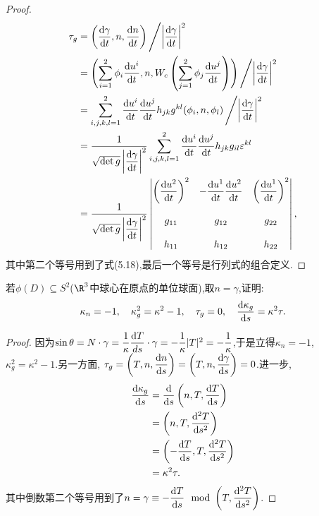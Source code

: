 	\begin{proof}
		\begin{align*}
			\tau_{g}&=\left(\frac{\mathrm{d} \gamma}{\mathrm{d} t},n,\frac{\mathrm{d} n}{\mathrm{d} t}\right)\left/\left|\frac{\mathrm{d} \gamma}{\mathrm{d} t}\right|^{2}\right.\\
			&=\Biggl(\sum_{i=1}^{2}\phi_{i}\frac{\mathrm{d} u^{i}}{\mathrm{d} t},n,W_{c}\left(\sum_{j=1}^{2}\phi_{j}\frac{\mathrm{d} u^{j}}{\mathrm{d} t}\right)\Biggr)\left/\left|\frac{\mathrm{d} \gamma}{\mathrm{d} t}\right|^{2}\right.\\
			&=\sum_{i,j,k,l=1}^{2}\frac{\mathrm{d} u^{i}}{\mathrm{d} t}\frac{\mathrm{d} u^{j}}{\mathrm{d} t}h_{jk}g^{kl}(\phi_{i},n,\phi_{l})\left/\left|\frac{\mathrm{d} \gamma}{\mathrm{d} t}\right|^{2}\right.\\
			&=\frac{1}{\sqrt{\det g}\left| \dfrac{\mathrm{d}\gamma}{\mathrm{d} t} \right|^{2}}\sum_{i,j,k,l=1}^{2}\frac{\mathrm{d} u^{i}}{\mathrm{d} t}\frac{\mathrm{d} u^{j}}{\mathrm{d} t}h_{jk}g_{il}\varepsilon^{kl}\\
			&=\frac{1}{\sqrt{\det g}\left| \dfrac{\mathrm{d}\gamma}{\mathrm{d} t} \right|^{2}}
			\begin{vmatrix}
				\left( \dfrac{\mathrm{d} u^{2}}{\mathrm{d} t} \right)^{2}&-\dfrac{\mathrm{d} u^{1}}{\mathrm{d} t}\dfrac{\mathrm{d} u^{2}}{\mathrm{d} t}&\left( \dfrac{\mathrm{d} u^{1}}{\mathrm{d} t} \right)^{2}\\ \\
				g_{11}&g_{12}&g_{22}\\ \\
				h_{11}&h_{12}&h_{22}
			\end{vmatrix},
		\end{align*}
		其中第二个等号用到了式(5.18),最后一个等号是行列式的组合定义.
	\end{proof}
	\begin{excise}
		若$\phi(D)\subseteq S^{2}$($\R^{3}$中球心在原点的单位球面),取$n=\gamma$,证明:
		$$
		\kappa_{n}=-1,\quad \kappa_{g}^{2}=\kappa^{2}-1,\quad \tau_{g}=0,\quad \frac{\mathrm{d}\kappa_{g}}{\mathrm{d} s}=\kappa^{2}\tau.
		$$
	\end{excise}
	\begin{proof}
		因为$\sin\theta=N\cdot\gamma=\dfrac{1}{\kappa}\dfrac{\mathrm{d} T}{ds}\cdot\gamma=-\dfrac{1}{\kappa}|T|^{2}=-\dfrac{1}{\kappa}$,于是立得$\kappa_{n}=-1$, $\kappa_{g}^{2}=\kappa^{2}-1$.另一方面, $\tau_{g}=\left(T,n,\dfrac{\mathrm{d} n}{\mathrm{d} s}\right)=\left(T,n,\dfrac{\mathrm{d} \gamma}{\mathrm{d} s}\right)=0$.进一步,
		\begin{align*}
			\frac{\mathrm{d} \kappa_{g}}{\mathrm{d} s}&=\frac{\mathrm{d} }{\mathrm{d} s}\left(n,T,\frac{\mathrm{d} T}{\mathrm{d} s}\right)\\
			&=\left(n,T,\frac{\mathrm{d}^{2} T}{\mathrm{d} s^{2}}\right)\\
			&=\left(-\frac{\mathrm{d} T}{\mathrm{d} s},T,\frac{\mathrm{d}^{2} T}{\mathrm{d} s^{2}}\right)\\
			&=\kappa^{2}\tau.
		\end{align*}
		其中倒数第二个等号用到了$n=\gamma\equiv-\dfrac{\mathrm{d} T}{\mathrm{d} s}\mod \left(T,\dfrac{\mathrm{d}^{2} T}{\mathrm{d} s^{2}}\right)$.
	\end{proof}
